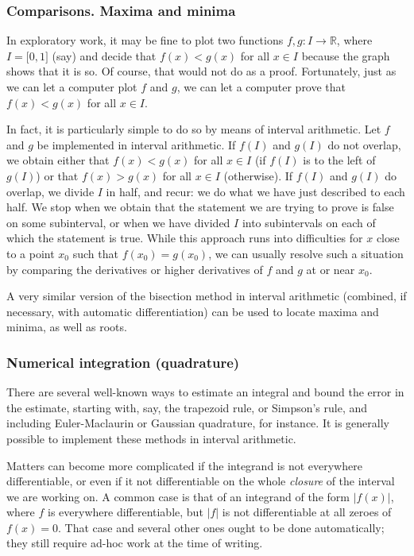 \subsubsection{Comparisons. Maxima and minima}

In exploratory work, it may be fine to plot two functions
$f,g:I\to \mathbb{R}$, where $I=\lbrack 0,1\rbrack$ (say) and decide that $f(x)<g(x)$ for all $x\in I$
because the graph shows that it is so. Of course,
that would not do as a proof. Fortunately, just as we can let a computer plot
$f$ and $g$, we can let a computer prove that $f(x)<g(x)$ for all $x\in I$.

In fact, it is particularly simple to do so by means of interval arithmetic.
Let $f$ and $g$ be implemented in interval arithmetic. If $f(I)$ and $g(I)$
do not overlap, we obtain either that $f(x)<g(x)$ for all $x\in I$ (if $f(I)$
is to the left of $g(I)$) or that $f(x)>g(x)$ for all $x\in I$ (otherwise).
If $f(I)$ and $g(I)$ do overlap, we divide $I$ in half, and recur:
we do what we have just described
to each half. We stop when we obtain that the statement we are trying to prove
is false on some subinterval, or when we have divided $I$ into subintervals
on each of which the statement is true. While this approach runs into
difficulties for $x$ close to a point $x_0$ such that $f(x_0)=g(x_0)$, we can
usually resolve such a situation by comparing the derivatives or higher
derivatives of $f$ and $g$ at or near $x_0$.

A very similar version of the bisection method in interval arithmetic
(combined, if necessary, with automatic differentiation)
can be used to locate maxima and minima, as well as roots.

\subsubsection{Numerical integration (quadrature)}

There are several well-known ways to estimate an integral and bound the error
in the estimate, starting with, say, the trapezoid rule, or Simpson's rule,
and including Euler-Maclaurin or Gaussian quadrature, for instance.
It is generally possible to implement these methods in interval arithmetic.

Matters can become more complicated if the integrand is not everywhere
differentiable, or even if it not differentiable on the whole {\em closure}
of the interval we are working on. A common case is that of an integrand of the form $|f(x)|$,
where $f$ is everywhere differentiable, but $|f|$ is not differentiable at
all zeroes of $f(x)=0$. That case and several other ones ought to be done
automatically; they still require ad-hoc work at the time of writing.

